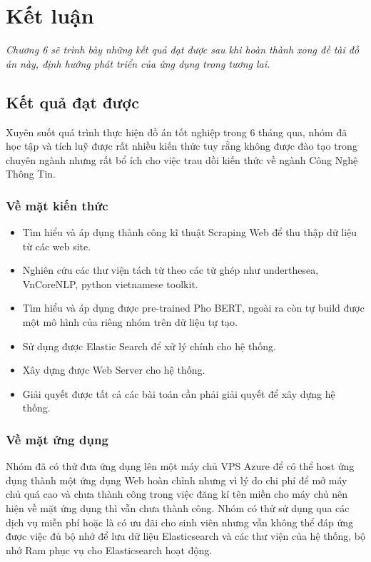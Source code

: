 \chapter{Kết luận}
\label{Chapter6}

\textit{Chương 6 sẽ trình bày những kết quả đạt được sau khi hoàn thành xong đề tài đồ án này, định hướng phát triển của ứng dụng trong tương lai.}

\section{Kết quả đạt được}

Xuyên suốt quá trình thực hiện đồ án tốt nghiệp trong 6 tháng qua, nhóm đã học tập và tích luỹ được rất nhiều kiến thức tuy rằng không được đào tạo trong chuyên ngành nhưng rất bổ ích cho việc trau dồi kiến thức về ngành Công Nghệ Thông Tin.

\subsection{Về mặt kiến thức}
\begin{itemize}
	\item [-] Tìm hiểu và áp dụng thành công kĩ thuật Scraping Web để thu thập dữ liệu từ các web site.
	\item [-] Nghiên cứu các thư viện tách từ theo các từ ghép như underthesea, VnCoreNLP, python vietnamese toolkit.
	\item [-] Tìm hiểu và áp dụng được pre-trained Pho BERT, ngoài ra còn tự build được một mô hình của riêng nhóm trên dữ liệu tự tạo.
	\item [-] Sử dụng được Elastic Search để xử lý chính cho hệ thống.
	\item [-] Xây dựng được Web Server cho hệ thống.
	\item [-] Giải quyết được tất cả các bài toán cần phải giải quyết để xây dựng hệ thống.
\end{itemize}

\subsection{Về mặt ứng dụng}

Nhóm đã có thử đưa ứng dụng lên một máy chủ VPS Azure để có thể host ứng dụng thành một ứng dụng Web hoàn chỉnh nhưng vì lý do chi phí để mở máy chủ quá cao và chưa thành công trong việc đăng kí tên miền cho máy chủ nên hiện về mặt ứng dụng thì vẫn chưa thành công. Nhóm có thử sử dụng qua các dịch vụ miễn phí hoặc là có ưu đãi cho sinh viên nhưng vẫn không thể đáp ứng được việc đủ bộ nhớ để lưu dữ liệu Elasticsearch và các thư viện của hệ thống, bộ nhớ Ram phục vụ cho Elasticsearch hoạt động.
